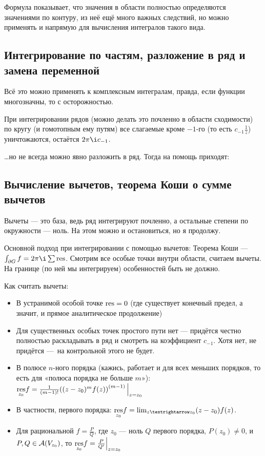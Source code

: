 \documentclass[12pt, a4paper]{article}
\begin{document}
Формула показывает, что значения в области полностью определяются значениями по контуру, 
из неё ещё много важных следствий, 
но можно применять и напрямую для вычисления интегралов такого вида.

\subsection{Интегрирование по частям, разложение в ряд и замена переменной}

Всё это можно применять к комплексным интегралам, правда, если функции многозначны, то с осторожностью.

При интегрировании рядов (можно делать это почленно в области сходимости) по кругу (и гомотопным ему путям) 
все слагаемые кроме $-1$-го (то есть $c_{-1}\frac{1}{z}$) уничтожаются, остаётся $2 \pi \i c_{-1}$.

…но не всегда можно явно разложить в ряд. Тогда на помощь приходят:

\subsection{Вычисление вычетов, теорема Коши о сумме вычетов}

Вычеты — это база, ведь ряд интегрируют почленно, а остальные степени по окружности — ноль.
На этом можно и остановиться, но я продолжу.

Основной подход при интегрировании с помощью вычетов: Теорема Коши — $\int_{\partial G} f = 2\pi \i \sum \operatorname{res}$. Смотрим все особые точки внутри области, считаем вычеты. 
На границе (по ней мы интегрируем) особенностей быть не должно.

Как считать вычеты:
\begin{itemize}
  \item В устранимой особой точке $\operatorname{res} = 0$ (где существует конечный предел, а значит, и прямое аналитическое продолжение)
  \item Для существенных особых точек простого пути нет — придётся честно полностью раскладывать в ряд и смотреть на коэффициент $c_{-1}$. Хотя нет, не придётся — на контрольной этого не будет.
  \item В полюсе $n$-ного порядка (кажись, работает и для всех меньших порядков, то есть для «полюса порядка не больше $m$»): $\underset{z_0}{\res} f = \frac{1}{(m - 1)!} \restr{\left((z - z_0)^m f(z)\right)^{(m - 1)}}{z = z_0}$
  \item В частности, первого порядка: $\underset{z_0}{\res} f = \lim_{z → z_0} (z - z_0) f(z)$.
  \item Для рациональной $f = \frac{P}{Q}$, где $z_0$ — ноль $Q$ первого порядка, $P(z_0) ≠ 0$, и $P, Q \in {\mathcal{A}}(V_{z_0})$, то $\underset{z_0}{\res} f = \restr{\frac{P}{Q'}}{z = z_0}$
\end{itemize}
\end{document}
